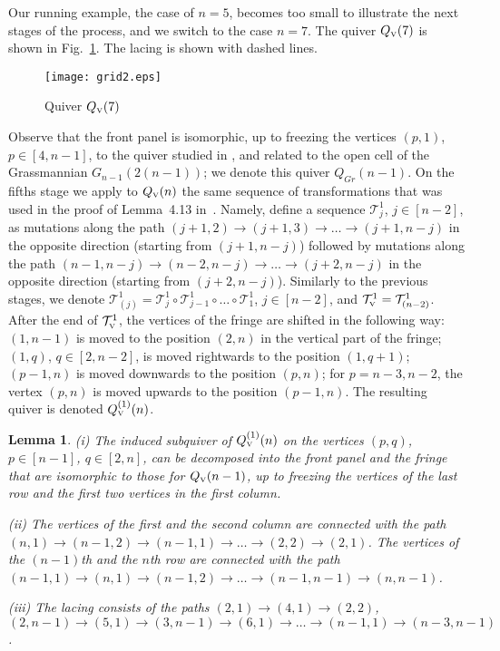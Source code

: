 \documentclass{amsart}
\newtheorem{lemma}[theorem]{Lemma}
\theoremstyle{definition}
\theoremstyle{remark}
\numberwithin{equation}{section}
\numberwithin{theorem}{section}
\begin{document}
Our running example, the case of $n=5$, becomes too small to illustrate the next stages of the process, and
we switch to the case $n=7$.
 The quiver $Q_{\mbox{\tiny\rm V}}(7)$ is shown in Fig.~\ref{fig:grid2}. The lacing is shown with dashed lines.
 
 \begin{figure}[ht]
\begin{center}
\texttt{[image: grid2.eps]}
\caption{Quiver $Q_{\mbox{\tiny\rm V}}(7)$ }
\label{fig:grid2}
\end{center}
\end{figure}  

Observe that the front panel is isomorphic, up to freezing the vertices $(p,1)$, $p\in [4,n-1]$, to the quiver
studied in \cite{GSV1}, \cite[Ch.~4.2]{GSVb} and related to the open cell of the Grassmannian $G_{n-1}(2(n-1))$;
we denote this quiver $Q_{Gr}(n-1)$.
On the fifths stage we apply to $Q_{\mbox{\tiny\rm V}}(n)$ the same sequence of transformations that was used in the proof of Lemma~4.13 in~\cite{GSVb}. 
Namely, define a sequence ${{\mathcal T}}_j^1$, $j\in [n-2]$, as mutations along the path $(j+1,2)\to(j+1,3)\to\dots\to
(j+1,n-j)$ in the opposite direction (starting from $(j+1,n-j)$) followed by mutations along the path 
$(n-1,n-j)\to(n-2,n-j)\to\dots\to(j+2,n-j)$ in the opposite direction (starting from $(j+2,n-j)$).
Similarly to the previous stages, we denote
 ${{\mathcal T}}_{(j)}^1={{\mathcal T}}_{j}^1\circ{{\mathcal T}}_{j-1}^1\circ\dots\circ{{\mathcal T}}_{1}^1$, 
$j\in [n-2]$, and ${{\mathcal T}}^1_{\mbox{\tiny\rm V}}={{\mathcal T}}_{(n-2)}^1$. After the end of ${{\mathcal T}}^1_{\mbox{\tiny\rm V}}$, the vertices of the
fringe are shifted in the following way: $(1,n-1)$ is moved to the position $(2,n)$ in the vertical part of the fringe; $(1,q)$, $q\in [2,n-2]$, is moved rightwards to the position $(1,q+1)$; 
$(p-1,n)$ is moved downwards to the position $(p,n)$;
for $p=n-3,n-2$, the vertex $(p,n)$ is  moved upwards to the position $(p-1,n)$.
The resulting quiver is denoted $Q^{(1)}_{\mbox{\tiny\rm V}}(n)$.

 \begin{lemma}
 \label{grassmanind}
{\rm (i)} The induced subquiver of $Q^{(1)}_{\mbox{\tiny\rm V}}(n)$
on the vertices $(p,q)$, $p\in [n-1]$, $q\in [2,n]$, can be decomposed into the
front panel and the fringe that are isomorphic to those for $Q_{\mbox{\tiny\rm V}}(n-1)$, 
up to freezing the vertices of the last 
row and the first two vertices in the first column.

{\rm (ii)} The vertices of the first and the second column are connected with the path
$(n,1)\to(n-1,2)\to(n-1,1)\to\dots\to (2,2)\to (2,1)$. The vertices of the $(n-1)$th and the
$n$th row are connected with the path
$(n-1,1)\to (n,1)\to(n-1,2)\to\dots\to (n-1,n-1)\to (n,n-1)$.

{\rm (iii)} The lacing 
consists of the paths $(2,1)\to(4,1)\to(2,2)$, 
$(2,n-1)\to(5,1)\to(3,n-1)\to(6,1)\to\dots\to(n-1,1)\to(n-3,n-1)$.
\end{lemma}
 
\end{document}
